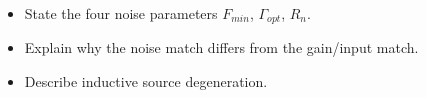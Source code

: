 \begin{objectives}
\begin{itemize}[leftmargin=1.4em,itemsep=2pt]
\item State the four noise parameters $F_{min}$, $\Gamma_{opt}$, $R_n$.
\item Explain why the noise match differs from the gain/input match.
\item Describe inductive source degeneration.
\end{itemize}
\end{objectives}
